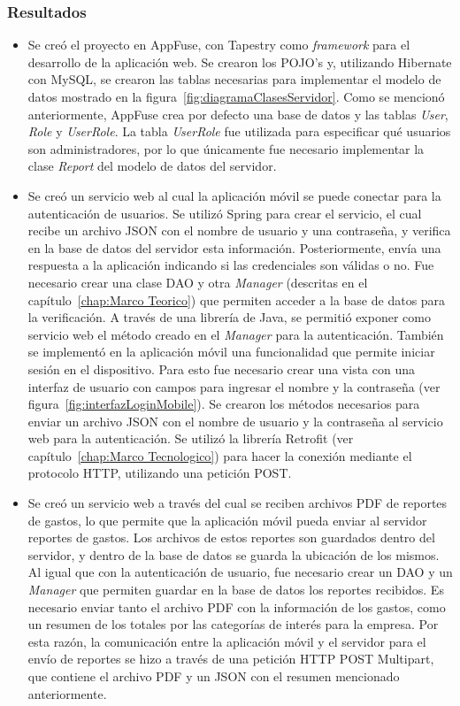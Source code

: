\subsubsection{Resultados}
\begin{itemize}
\item Se creó el proyecto en AppFuse, con Tapestry como \textit{framework} para el desarrollo de la aplicación web. Se crearon los POJO's y, utilizando Hibernate con MySQL, se crearon las tablas necesarias para implementar el modelo de datos mostrado en la figura~\ref{fig:diagramaClasesServidor}. Como se mencionó anteriormente, AppFuse crea por defecto una base de datos y las tablas \textit{User}, \textit{Role} y \textit{UserRole}. La tabla \textit{UserRole} fue utilizada para especificar qué usuarios son administradores, por lo que únicamente fue necesario implementar la clase \textit{Report} del modelo de datos del servidor.
\item Se creó un servicio web al cual la aplicación móvil se puede conectar para la autenticación de usuarios. Se utilizó Spring para crear el servicio, el cual recibe un archivo JSON con el nombre de usuario y una contraseña, y verifica en la base de datos del servidor esta información. Posteriormente, envía una respuesta a la aplicación indicando si las credenciales son válidas o no. Fue necesario crear una clase DAO y otra \textit{Manager} (descritas en el capítulo~\ref{chap:Marco Teorico}) que permiten acceder a la base de datos para la verificación. A través de una librería de Java, se permitió exponer como servicio web el método creado en el \textit{Manager} para la autenticación.
También se implementó en la aplicación móvil una funcionalidad que permite iniciar sesión en el dispositivo. Para esto fue necesario crear una vista con una interfaz de usuario con campos para ingresar el nombre y la contraseña (ver figura~\ref{fig:interfazLoginMobile}). Se crearon los métodos necesarios para enviar un archivo JSON con el nombre de usuario y la contraseña al servicio web para la autenticación. Se utilizó la librería Retrofit (ver capítulo~\ref{chap:Marco Tecnologico}) para hacer la conexión mediante el protocolo HTTP, utilizando una petición POST.
\item Se creó un servicio web a través del cual se reciben archivos PDF de reportes de gastos, lo que permite que la aplicación móvil pueda enviar al servidor reportes de gastos. Los archivos de estos reportes son guardados dentro del servidor, y dentro de la base de datos se guarda la ubicación de los mismos. Al igual que con la autenticación de usuario, fue necesario crear un DAO y un \textit{Manager} que permiten guardar en la base de datos los reportes recibidos. Es necesario enviar tanto el archivo PDF con la información de los gastos, como un resumen de los totales por las categorías de interés para la empresa. Por esta razón, la comunicación entre la aplicación móvil y el servidor para el envío de reportes se hizo a través de una petición HTTP POST Multipart, que contiene el archivo PDF y un JSON con el resumen mencionado anteriormente.


\end{itemize}
